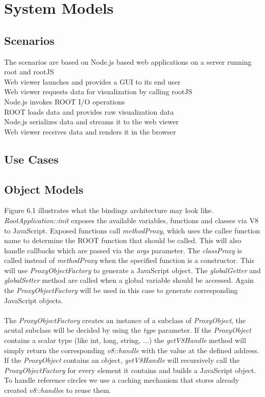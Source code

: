 \chapter{System Models}

\section{Scenarios}
The scenarios are based on Node.js based web applications on a server running root and rootJS\\

Web viewer launches and provides a GUI to its end user	\\
Web viewer requests data for visualization by calling rootJS\\
\indent	Node.js invokes ROOT I/O operations\\
\indent \indent		ROOT loads data and provides raw visualization data\\
\indent	Node.js serializes data and streams it to the web viewer\\
Web viewer receives data and renders it in the browser\\
\section{Use Cases}

\pagebreak[4]

\section{Object Models}
Figure 6.1 illustrates what the bindings architecture may look like.
\textit{RootApplication::init} exposes the available variables, functions and classes via V8 to JavaScript.
Exposed functions call \textit{methodProxy}, which uses the callee function name to determine the ROOT function that should be called. This will also handle callbacks which are passed via the \textit{args} parameter.
The \textit{classProxy} is called instead of \textit{methodProxy} when the specified function is a constructor. This will use \textit{ProxyObjectFactory} to generate a JavaScript object.
The \textit{globalGetter} and \textit{globalSetter} method are called when a global variable should be accessed. Again the \textit{ProxyObjectFactory} will be used in this case to generate corresponding JavaScript objects.
\\\\
The \textit{ProxyObjectFactory} creates an instance of a subclass of \textit{ProxyObject}, the acutal subclass will be decided by using the \textit{type} parameter.
If the \textit{ProxyObject} contains a scalar type (like int, long, string, ...) the \textit{getV8Handle} method will simply return the corresponding \textit{v8::handle} with the value at the defined address.
If the \textit{ProxyObject} contains an object, \textit{getV8Handle} will recursively call the \textit{ProxyObjectFactory} for every element it contains and builds a JavaScript object.
To handle reference circles we use a caching mechanism that stores already created \textit{v8::handle}s to reuse them.

